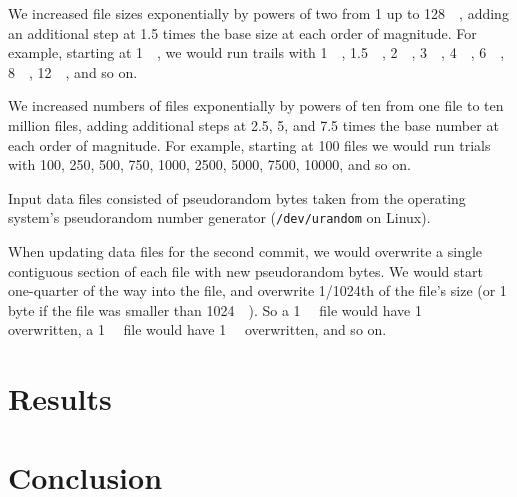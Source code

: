 \documentclass[
    usenglish,
]{nik}
\begin{document}
We increased file sizes exponentially by powers of two from \SI{1}{\byte} up to \SI{128}{\gibi\byte}, adding an additional step at \num{1.5} times the base size at each order of magnitude.
For example, starting at \SI{1}{\mebi\byte}, we would run trails with \SI{1}{\mebi\byte}, \SI{1.5}{\mebi\byte}, \SI{2}{\mebi\byte}, \SI{3}{\mebi\byte}, \SI{4}{\mebi\byte}, \SI{6}{\mebi\byte}, \SI{8}{\mebi\byte}, \SI{12}{\mebi\byte}, and so on.

We increased numbers of files exponentially by powers of ten from one file to ten million files, adding additional steps at \num{2.5}, \num{5}, and \num{7.5} times the base number at each order of magnitude.
For example, starting at \num{100} files we would run trials with \num{100}, \num{250}, \num{500}, \num{750}, \num{1000}, \num{2500}, \num{5000}, \num{7500}, \num{10000}, and so on.

Input data files consisted of pseudorandom bytes taken from the operating system's pseudorandom number generator (\lstinline{/dev/urandom} on Linux).

When updating data files for the second \gls{commit}, we would overwrite a single contiguous section of each file with new pseudorandom bytes.
We would start one-quarter of the way into the file, and overwrite \num{1/1024}th of the file's size (or 1 byte if the file was smaller than \SI{1024}{\kibi\byte}).
So a \SI{1}{\mebi\byte} file would have \SI{1}{\kibi\byte} overwritten, a \SI{1}{\gibi\byte} file would have \SI{1}{\mebi\byte} overwritten, and so on.

%

\section{Results}



\section{Conclusion}




\printbibliography[]

\listoftodos

\ifoptionfinal{}{
    
}
\end{document}

